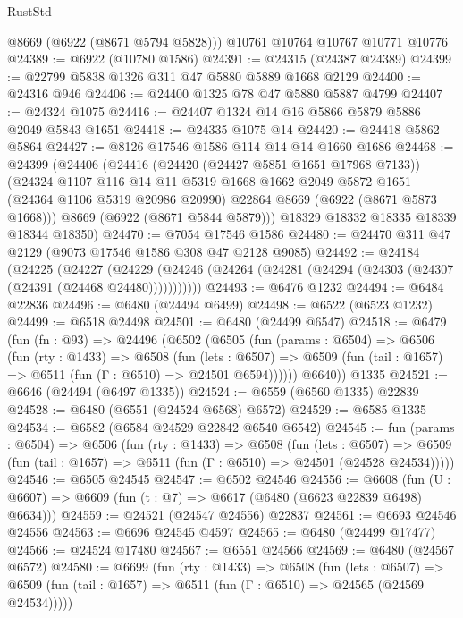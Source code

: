 \begin{lexlean}{RustStd}
\begin{coremodule}
      @8669
      (@6922 (@8671 @5794 @5828)))
    @10761
    @10764
    @10767
    @10771
    @10776
@24389 := @6922 (@10780 @1586)
@24391 := @24315 (@24387 @24389)
@24399 := @22799 @5838 @1326 @311 @47 @5880 @5889 @1668 @2129
@24400 := @24316 @946
@24406 := @24400 @1325 @78 @47 @5880 @5887 @4799
@24407 := @24324 @1075
@24416 := @24407 @1324 @14 @16 @5866 @5879 @5886 @2049 @5843 @1651
@24418 := @24335 @1075 @14
@24420 := @24418 @5862 @5864
@24427 := @8126 @17546 @1586 @114 @14 @14 @1660 @1686
@24468 := @24399
    (@24406
      (@24416
        (@24420 (@24427 @5851 @1651 @17968 @7133))
        (@24324
          @1107
          @116
          @14
          @11
          @5319
          @1668
          @1662
          @2049
          @5872
          @1651
          (@24364 @1106 @5319 @20986 @20990)
          @22864
          @8669
          (@6922 (@8671 @5873 @1668)))
        @8669
        (@6922 (@8671 @5844 @5879)))
      @18329
      @18332
      @18335
      @18339
      @18344
      @18350)
@24470 := @7054 @17546 @1586
@24480 := @24470 @311 @47 @2129 (@9073 @17546 @1586 @308 @47 @2128 @9085)
@24492 := @24184
    (@24225
      (@24227
        (@24229 (@24246 (@24264 (@24281 (@24294 (@24303 (@24307 (@24391 (@24468 @24480)))))))))))
@24493 := @6476 @1232
@24494 := @6484 @22836
@24496 := @6480 (@24494 @6499)
@24498 := @6522 (@6523 @1232)
@24499 := @6518 @24498
@24501 := @6480 (@24499 @6547)
@24518 := @6479
    (fun (fn : @93) =>
    @24496
      (@6502
        (@6505
          (fun (params : @6504) =>
          @6506
            (fun (rty : @1433) =>
            @6508
              (fun (lets : @6507) =>
              @6509 (fun (tail : @1657) => @6511 (fun (Γ : @6510) => @24501 @6594))))))
        @6640))
    @1335
@24521 := @6646 (@24494 (@6497 @1335))
@24524 := @6559 (@6560 @1335) @22839
@24528 := @6480 (@6551 (@24524 @6568) @6572)
@24529 := @6585 @1335
@24534 := @6582 (@6584 @24529 @22842 @6540 @6542)
@24545 := fun (params : @6504) =>
  @6506
    (fun (rty : @1433) =>
    @6508
      (fun (lets : @6507) =>
      @6509 (fun (tail : @1657) => @6511 (fun (Γ : @6510) => @24501 (@24528 @24534)))))
@24546 := @6505 @24545
@24547 := @6502 @24546
@24556 := @6608
    (fun (U : @6607) => @6609 (fun (t : @7) => @6617 (@6480 (@6623 @22839 @6498) @6634)))
@24559 := @24521 (@24547 @24556) @22837
@24561 := @6693 @24546 @24556
@24563 := @6696 @24545 @4597
@24565 := @6480 (@24499 @17477)
@24566 := @24524 @17480
@24567 := @6551 @24566
@24569 := @6480 (@24567 @6572)
@24580 := @6699
    (fun (rty : @1433) =>
    @6508
      (fun (lets : @6507) =>
      @6509 (fun (tail : @1657) => @6511 (fun (Γ : @6510) => @24565 (@24569 @24534)))))

\end{coremodule}
\end{lexlean}
